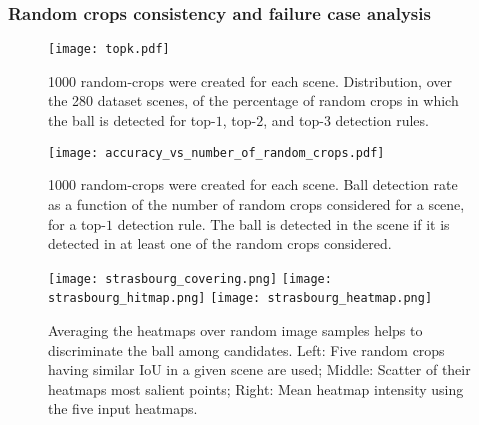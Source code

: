\documentclass[sigconf, screen]{acmart}
\begin{document}
\subsubsection{Random crops consistency and failure case analysis}

\begin{figure}
    \begin{center}
    \texttt{[image: topk.pdf]}
    \caption{1000 random-crops were created for each scene.
    Distribution, over the 280 dataset scenes, of the percentage of random crops in which the ball is detected for top-$1$, top-$2$, and top-$3$ detection rules.}
    \label{fig:topk_helps}
    \end{center}
\end{figure}


\begin{figure}
    \begin{center}
    \texttt{[image: accuracy\_vs\_number\_of\_random\_crops.pdf]}
    \caption{1000 random-crops were created for each scene.
    Ball detection rate as a function of the number of random crops considered for a scene, for a top-$1$ detection rule. The ball is detected in the scene if it is detected in at least one of the random crops considered.}
    \label{fig:multiple_random_crops}
    \end{center}
\end{figure}

\begin{figure*}
    \begin{center}
    \texttt{[image: strasbourg\_covering.png]}
    \texttt{[image: strasbourg\_hitmap.png]}
    \texttt{[image: strasbourg\_heatmap.png]}
    \end{center}
    \vspace{-10pt}
    \caption{Averaging the heatmaps over random image samples helps to discriminate the ball among candidates. Left: Five random crops having similar IoU in a given scene are used; Middle: Scatter of their heatmaps most salient points; Right: Mean heatmap intensity using the five input heatmaps.}
    \label{fig:stacking_strategy}
\end{figure*}
\end{document}

